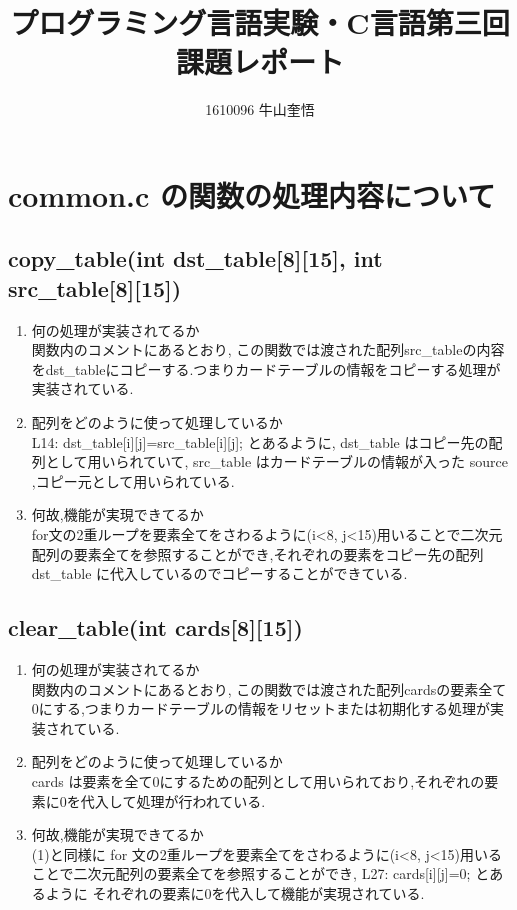 \documentclass{jsarticle}
\begin{document}
\title{プログラミング言語実験・C言語第三回課題レポート}
\author{1610096 牛山奎悟}
\maketitle

\section{common.c の関数の処理内容について}
\subsection{copy\_table(int dst\_table[8][15], int src\_table[8][15])}
\begin{enumerate}

  \item  何の処理が実装されてるか\\
  関数内のコメントにあるとおり, この関数では渡された配列src\_tableの内容をdst\_tableにコピーする.つまりカードテーブルの情報をコピーする処理が実装されている.

  \item  配列をどのように使って処理しているか\\
  L14: dst\_table[i][j]=src\_table[i][j];
  とあるように,
  dst\_table はコピー先の配列として用いられていて, src\_table はカードテーブルの情報が入った source ,コピー元として用いられている.

  \item  何故,機能が実現できてるか\\
  for文の2重ループを要素全てをさわるように(i\textless 8, j\textless 15)用いることで二次元配列の要素全てを参照することができ,それぞれの要素をコピー先の配列 dst\_table に代入しているのでコピーすることができている.
\end{enumerate}
\subsection{clear\_table(int cards[8][15])}
\begin{enumerate}
  \item  何の処理が実装されてるか\\
  関数内のコメントにあるとおり, この関数では渡された配列cardsの要素全て0にする,つまりカードテーブルの情報をリセットまたは初期化する処理が実装されている.
  \item  配列をどのように使って処理しているか\\
  cards は要素を全て0にするための配列として用いられており,それぞれの要素に0を代入して処理が行われている.
  \item  何故,機能が実現できてるか\\
  (1)と同様に for 文の2重ループを要素全てをさわるように(i\textless 8, j\textless 15)用いることで二次元配列の要素全てを参照することができ,
  L27: cards[i][j]=0; とあるように
  それぞれの要素に0を代入して機能が実現されている.

\end{enumerate}
\end{document}
